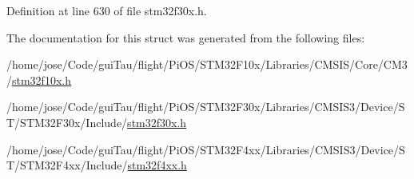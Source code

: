 Definition at line 630 of file stm32f30x.\-h.



The documentation for this struct was generated from the following files\-:\begin{DoxyCompactItemize}
\item 
/home/jose/\-Code/gui\-Tau/flight/\-Pi\-O\-S/\-S\-T\-M32\-F10x/\-Libraries/\-C\-M\-S\-I\-S/\-Core/\-C\-M3/\hyperlink{stm32f10x_8h}{stm32f10x.\-h}\item 
/home/jose/\-Code/gui\-Tau/flight/\-Pi\-O\-S/\-S\-T\-M32\-F30x/\-Libraries/\-C\-M\-S\-I\-S3/\-Device/\-S\-T/\-S\-T\-M32\-F30x/\-Include/\hyperlink{stm32f30x_8h}{stm32f30x.\-h}\item 
/home/jose/\-Code/gui\-Tau/flight/\-Pi\-O\-S/\-S\-T\-M32\-F4xx/\-Libraries/\-C\-M\-S\-I\-S3/\-Device/\-S\-T/\-S\-T\-M32\-F4xx/\-Include/\hyperlink{stm32f4xx_8h}{stm32f4xx.\-h}\end{DoxyCompactItemize}
